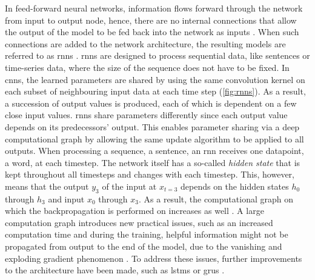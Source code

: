 In feed-forward neural networks, information flows forward through the network from input to output node, hence, there are no internal connections that allow
the output of the model to be fed back into the network as inputs \cite{aggarwal2018NeuralNetworksDeep, Goodfellow-et-al-2016}.
When such connections are added to the network architecture, the resulting models are referred to as \glspl{rnn} \cite{rumelhart1986LearningRepresentationsBackpropagating}.
\Glspl{rnn} are designed to process sequential data, like sentences or time-series data, where the size of the sequence does not have to be fixed.
In \glspl{cnn}, the learned parameters are shared by using the same convolution kernel on each subset of neighbouring input data at each time step (\autoref{fig:rnns}). 
As a result, a succession of output values is produced, each of which is dependent on a few close input values. 
\glspl{rnn} share parameters differently since each output value depends on its predecessors' output. 
This enables parameter sharing via a deep computational graph by allowing the same update algorithm to be applied to all outputs.
When processing a sequence, \eg a sentence, an \gls{rnn} receives one datapoint, \eg a word, at each timestep.
The network itself has a so-called \textit{hidden state} that is kept throughout all timesteps and changes with each timestep.
This, however, means that the output $y_3$ of the input at $x_{t=3}$ depends on the hidden states $h_0$ through $h_3$ and input $x_0$ through $x_3$.
As a result, the computational graph on which the backpropagation is performed on increases as well \cite{aggarwal2018NeuralNetworksDeep}.
A large computation graph introduces new practical issues, such as an increased computation time and during the training, helpful information might not be propagated from output to the end of the model,
due to the vanishing and exploding gradient phenomenon \cite{aggarwal2018NeuralNetworksDeep}.
To address these issues, further improvements to the architecture have been made, such as \glspl{lstm} \cite{hochreiter1997LongShortTermMemory} or \glspl{gru} \cite{cho2014PropertiesNeuralMachine}.

